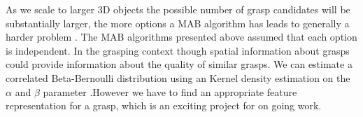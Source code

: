 \documentclass[10pt, conference]{ieeeconf}      %
\begin{document}
As we scale to larger 3D objects the possible number of grasp candidates will be substantially larger, the more options a MAB algorithm has leads to generally a harder problem \cite{bubeck2009pure}. The MAB algorithms presented above assumed that each option is independent. In the grasping context though spatial information about grasps could provide information about the quality of similar grasps. We can estimate a correlated Beta-Bernoulli distribution using an Kernel density estimation on the $\alpha$ and $\beta$ parameter \cite{goetschalckx2011continuous}.However we have to find an appropriate feature representation for a grasp, which is an exciting project for on going work. 


\end{document}
